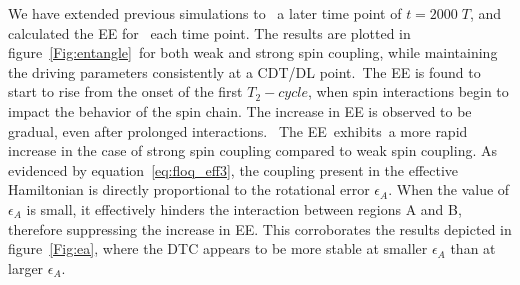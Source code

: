 \documentclass[12pt]{iopart}
\begin{document}
We have extended previous simulations to  a later time point of $t=2000\;T$, and calculated the EE for  each time point. The results are plotted in figure~\ref{Fig:entangle} for both weak and strong spin coupling, while maintaining the driving parameters consistently at a CDT/DL point. The EE is found to start to rise from the onset of the first $T_2-cycle$, when spin interactions begin to impact the behavior of the spin chain. The increase in EE is observed to be gradual, even after prolonged interactions.  The EE exhibits a more rapid increase in the case of strong spin coupling compared to weak spin coupling. As evidenced by equation~\eqref{eq:floq_eff3}, the coupling present in the effective Hamiltonian is directly proportional to the rotational error $\epsilon_A$. When the value of $\epsilon_A$ is small, it effectively hinders the interaction between regions A and B, therefore suppressing the increase in EE. This corroborates the results depicted in figure~\ref{Fig:ea}, where the DTC appears to be more stable at smaller $\epsilon_A$ than at larger $\epsilon_A$.
	
\end{document}
